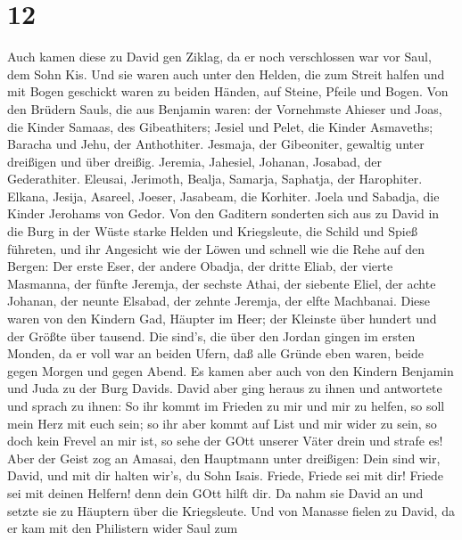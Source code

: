 \hypertarget{section-11}{%
\section{12}\label{section-11}}

 Auch kamen diese zu David gen Ziklag, da er noch
verschlossen war vor Saul, dem Sohn Kis. Und sie waren auch unter den
Helden, die zum Streit halfen  und mit Bogen geschickt waren
zu beiden Händen, auf Steine, Pfeile und Bogen. Von den Brüdern Sauls,
die aus Benjamin waren:  der Vornehmste Ahieser und Joas,
die Kinder Samaas, des Gibeathiters; Jesiel und Pelet, die Kinder
Asmaveths; Baracha und Jehu, der Anthothiter.  Jesmaja, der
Gibeoniter, gewaltig unter dreißigen und über dreißig. Jeremia,
Jahesiel, Johanan, Josabad, der Gederathiter.  Eleusai,
Jerimoth, Bealja, Samarja, Saphatja, der Harophiter. 
Elkana, Jesija, Asareel, Joeser, Jasabeam, die Korhiter. 
Joela und Sabadja, die Kinder Jerohams von Gedor.  Von den
Gaditern sonderten sich aus zu David in die Burg in der Wüste starke
Helden und Kriegsleute, die Schild und Spieß führeten, und ihr Angesicht
wie der Löwen und schnell wie die Rehe auf den Bergen:  Der
erste Eser, der andere Obadja, der dritte Eliab,  der
vierte Masmanna, der fünfte Jeremja,  der sechste Athai,
der siebente Eliel,  der achte Johanan, der neunte Elsabad,
 der zehnte Jeremja, der elfte Machbanai. 
Diese waren von den Kindern Gad, Häupter im Heer; der Kleinste über
hundert und der Größte über tausend.  Die sind's, die über
den Jordan gingen im ersten Monden, da er voll war an beiden Ufern, daß
alle Gründe eben waren, beide gegen Morgen und gegen Abend.
 Es kamen aber auch von den Kindern Benjamin und Juda zu
der Burg Davids.  David aber ging heraus zu ihnen und
antwortete und sprach zu ihnen: So ihr kommt im Frieden zu mir und mir
zu helfen, so soll mein Herz mit euch sein; so ihr aber kommt auf List
und mir wider zu sein, so doch kein Frevel an mir ist, so sehe der GOtt
unserer Väter drein und strafe es!  Aber der Geist zog an
Amasai, den Hauptmann unter dreißigen: Dein sind wir, David, und mit dir
halten wir's, du Sohn Isais. Friede, Friede sei mit dir! Friede sei mit
deinen Helfern! denn dein GOtt hilft dir. Da nahm sie David an und
setzte sie zu Häuptern über die Kriegsleute.  Und von
Manasse fielen zu David, da er kam mit den Philistern wider Saul zum
